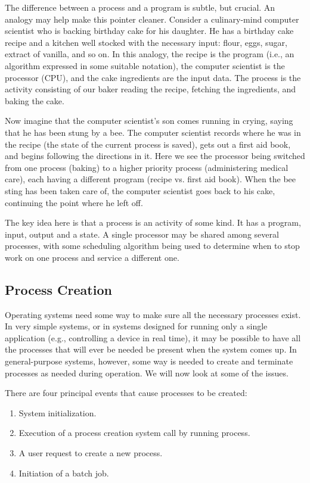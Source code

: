 \documentclass{book}
\begin{document}
The difference between a process and a program is subtle, but crucial.
An analogy may help make this pointer cleaner.
Consider a culinary-mind computer scientist who is backing birthday cake for his daughter.
He has a birthday cake recipe and a kitchen well stocked with the necessary input:
flour, eggs, sugar, extract of vanilla, and so on.
In this analogy, the recipe is the program (i.e., an algorithm expressed in some suitable notation),
the computer scientist is the processor (CPU), and the cake ingredients are the input data.
The process is the activity consisting of our baker reading the recipe, fetching the ingredients, and baking the cake.
 
Now imagine that the computer scientist's son comes running in crying, saying that he has been stung by a bee.
The computer scientist records where he was in the recipe (the state of the current process is saved),
gets out a first aid book, and begins following the directions in it.
Here we see the processor being switched from one process (baking) to a higher priority process (administering medical care),
each having a different program (recipe vs. first aid book).
When the bee sting has been taken care of, the computer scientist goes back to his cake,
continuing the point where he left off.

The key idea here is that a process is an activity of some kind.
It has a program, input, output and a state.
A single processor may be shared among several processes, with some scheduling algorithm being used to determine
when to stop work on one process and service a different one.

\subsection{Process Creation}
Operating systems need some way to make sure all the necessary processes exist.
In very simple systems, or in systems designed for running only a single application (e.g., controlling a device in real time),
it may be possible to have all the processes that will ever be needed be present when the system comes up.
In general-purpose systems, however, some way is needed to create and terminate processes as needed during operation.
We will now look at some of the issues.

There are four principal events that cause processes to be created:
\begin{enumerate}
  \item System initialization.
  \item Execution of a process creation system call by running process.
  \item A user request to create a new process.
  \item Initiation of a batch job.
\end{enumerate}
\end{document}
